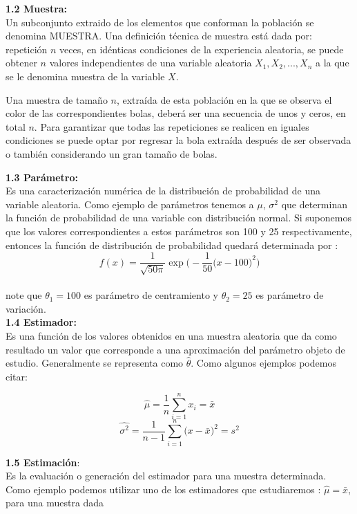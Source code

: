 \documentclass[base=hide,11pt]{elegantbook}
\begin{document}
\textcolor{col4}{\bf \large 1.2 Muestra:} \\
Un subconjunto extraido de los elementos que conforman la población se denomina MUESTRA. Una definición técnica de muestra está dada por: repetición $n$ veces, en idénticas condiciones de la experiencia aleatoria, se puede obtener $n$ valores independientes de una variable aleatoria $X_{1}, X_{2},...,X_{n}$ a la que se le denomina muestra de la variable $X$.

Una muestra de tamaño $n$, extraída de esta población en la que se observa el color de las correspondientes bolas, deberá ser una secuencia de unos y ceros, en total $n$. Para garantizar que todas las repeticiones se realicen en iguales condiciones se puede optar por regresar la bola extraída después de ser observada o también considerando un gran tamaño de bolas.   
%	
	
\textcolor{col4}{\bf \large 1.3 Parámetro:} \\ 
Es una caracterización numérica de la distribución de probabilidad de una variable aleatoria. Como ejemplo de parámetros tenemos a $\mu$, $\sigma^{2}$ que determinan la función de probabilidad de una variable con distribución normal. Si suponemos que los valores correspondientes a estos parámetros son 100 y 25 respectivamente, entonces la función de distribución de probabilidad quedará determinada por :
	$$f(x)=\frac{1}{\sqrt{50 \pi}} \exp{\Bigg(- \frac{1}{50}\big(x-100\big)^{2}\Bigg)}$$\\
%	
	note que $\theta_1=100$ es parámetro de centramiento y $\theta_2=25$ es parámetro de variación.\\

\textcolor{col4}{\bf \large  1.4 Estimador:} \\
Es una función de los valores obtenidos en una muestra aleatoria que da como resultado un valor que corresponde a una aproximación del parámetro objeto de estudio. Generalmente se representa como $\widehat{\theta}$. Como algunos ejemplos podemos citar:

	$$\widehat{\mu}=\frac{1}{n}\sum_{i=1}^{n}x_{i}=\bar{x} $$
	$$\widehat{\sigma^{2}}=\frac{1}{n-1}\sum_{i=1}^{n}\big(x-\bar{x}\big)^{2} = s^{2}$$

\textcolor{col4}{\bf \large 1.5 Estimación}:\\ 
Es la evaluación o generación del estimador para una muestra determinada. \\
	
	Como ejemplo podemos utilizar uno de los estimadores que estudiaremos :  $\widehat{\mu}= \bar{x}$, para una muestra dada
	
\end{document}
